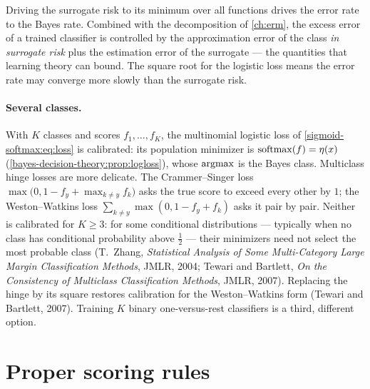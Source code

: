 \begin{notechapter}
\begin{keyidea}
Driving the surrogate risk to its minimum over all functions drives the error rate
to the Bayes rate. Combined with the decomposition of \cref{ch:erm}, the excess error
of a trained classifier is controlled by the approximation error of the class
\emph{in surrogate risk} plus the estimation error of the surrogate --- the
quantities that learning theory can bound. The square root for the logistic
loss means the error rate may converge more slowly than the surrogate risk.
\end{keyidea}

\paragraph{Several classes.} With $K$ classes and scores $f_1,\dots,f_K$, the multinomial
logistic loss of \cref{sigmoid-softmax:eq:loss} is calibrated: its population minimizer is
$\operatorname{softmax}(f) = \eta(x)$ (\cref{bayes-decision-theory:prop:logloss}), whose $\operatorname*{argmax}$ is the Bayes class. Multiclass
hinge losses are more delicate. The Crammer--Singer loss
$\max\bigl(0, 1 - f_y + \max_{k\neq y}f_k\bigr)$ asks the true score to exceed every other by $1$; the
Weston--Watkins loss $\sum_{k\neq y}\max(0, 1 - f_y + f_k)$ asks it pair by pair. Neither is
calibrated for $K\geq3$: for some conditional distributions --- typically when no class has
conditional probability above $\frac12$ --- their minimizers need not select the most probable
class (T.~Zhang, \emph{Statistical Analysis of Some Multi-Category Large Margin Classification
Methods}, JMLR, 2004; Tewari and Bartlett, \emph{On the Consistency of Multiclass Classification
Methods}, JMLR, 2007). Replacing the hinge by its square restores calibration for the
Weston--Watkins form (Tewari and Bartlett, 2007). Training $K$ binary one-versus-rest classifiers is a third,
different option.

\section{Proper scoring rules}\label{surrogate-losses:sec:proper}


\end{notechapter}
